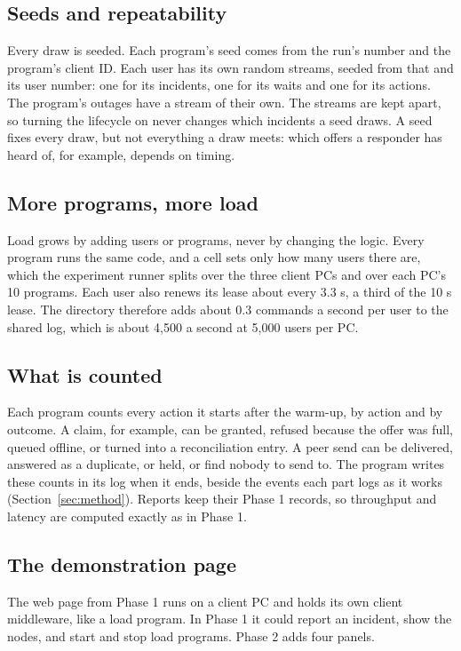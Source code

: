 \subsection{Seeds and repeatability}

Every draw is seeded. Each program's seed comes from the run's number and the program's client ID. Each user has its own random streams, seeded from that and its user number: one for its incidents, one for its waits and one for its actions. The program's outages have a stream of their own. The streams are kept apart, so turning the lifecycle on never changes which incidents a seed draws. A seed fixes every draw, but not everything a draw meets: which offers a responder has heard of, for example, depends on timing.

\subsection{More programs, more load}

Load grows by adding users or programs, never by changing the logic. Every program runs the same code, and a cell sets only how many users there are, which the experiment runner splits over the three client PCs and over each PC's 10 programs. Each user also renews its lease about every 3.3 s, a third of the 10 s lease. The directory therefore adds about 0.3 commands a second per user to the shared log, which is about 4,500 a second at 5,000 users per PC.

\subsection{What is counted}

Each program counts every action it starts after the warm-up, by action and by outcome. A claim, for example, can be granted, refused because the offer was full, queued offline, or turned into a reconciliation entry. A peer send can be delivered, answered as a duplicate, or held, or find nobody to send to. The program writes these counts in its log when it ends, beside the events each part logs as it works (Section~\ref{sec:method}). Reports keep their Phase 1 records, so throughput and latency are computed exactly as in Phase 1.

\subsection{The demonstration page}
\label{sec:page}

The web page from Phase 1 runs on a client PC and holds its own client middleware, like a load program. In Phase 1 it could report an incident, show the nodes, and start and stop load programs. Phase 2 adds four panels.

